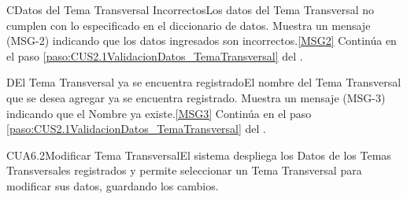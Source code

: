 	\begin{UCtrayectoriaA}{C}{Datos del Tema Transversal Incorrectos}{Los datos del Tema Transversal no cumplen con lo especificado en el diccionario de datos.}
			\UCpaso Muestra un mensaje (MSG-2) indicando que los datos ingresados son incorrectos.\ref{MSG2}
			\UCpaso Continúa en el paso \ref{paso:CUS2.1ValidacionDatos_TemaTransversal} del .
	\end{UCtrayectoriaA}

		\begin{UCtrayectoriaA}{D}{El Tema Transversal ya se encuentra registrado}{El nombre del Tema Transversal que se desea agregar ya se encuentra registrado.}
			\UCpaso Muestra un mensaje (MSG-3) indicando que el Nombre ya existe.\ref{MSG3}
			\UCpaso Continúa en el paso \ref{paso:CUS2.1ValidacionDatos_TemaTransversal} del .
		\end{UCtrayectoriaA}


	\begin{UseCase}{CUA6.2}{Modificar Tema Transversal}{El sistema despliega los Datos de los Temas Transversales registrados y permite seleccionar un Tema Transversal para modificar sus datos, guardando los cambios.}
	\end{UseCase}

